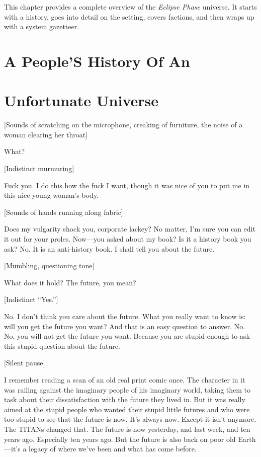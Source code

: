 This chapter provides a complete overview of the
\textit{Eclipse Phase} universe. It starts with a history, goes 
into detail on the setting, covers factions, and then 
wraps up with a system gazetteer.

\section{A People'S History Of An }


\section{Unfortunate Universe}

[Sounds of scratching on the microphone, creaking of 
furniture, the noise of a woman clearing her throat]

What?

[Indistinct murmuring]

Fuck you. I do this how the fuck I want, though 
it was nice of you to put me in this nice young 
woman's body.

[Sounds of hands running along fabric]

Does my vulgarity shock you, corporate lackey? No 
matter, I'm sure you can edit it out for your proles. 
Now—you asked about my book? Is it a history book 
you ask? No. It is an anti-history book. I shall tell you 
about the future.

[Mumbling, questioning tone]

What does it hold? The future, you mean?

[Indistinct ``Yes.'']

No. I don't think you care about the future. What 
you really want to know is: will you get the future 
you want? And that is an easy question to answer. No. 
No, you will not get the future you want. Because you 
are stupid enough to ask this stupid question about 
the future.

[Silent pause]

I remember reading a scan of an old real print 
comic once. The character in it was railing against 
the imaginary people of his imaginary world, taking 
them to task about their dissatisfaction with the 
future they lived in. But it was really aimed at the 
stupid people who wanted their stupid little futures 
and who were too stupid to see that the future is 
now. It's always now. Except it isn't anymore. The 
TITANs changed that. The future is now yesterday, 
and last week, and ten years ago. Especially ten 
years ago. But the future is also back on poor old 
Earth—it's a legacy of where we've been and what 
has come before.

